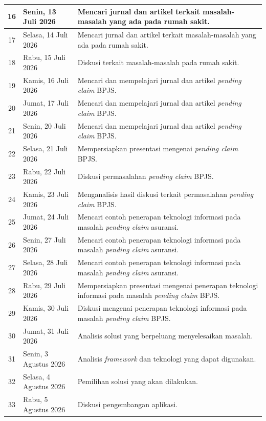 \begin{small}
\begin{longtable}{|c|>{\raggedright\arraybackslash}p{4.0cm}|>{\raggedright\arraybackslash}p{7.8cm}|}
16 & Senin, 13 Juli 2026 & Mencari jurnal dan artikel terkait masalah-masalah yang ada pada rumah sakit. \\ \hline
17 & Selasa, 14 Juli 2026 & Mencari jurnal dan artikel terkait masalah-masalah yang ada pada rumah sakit. \\ \hline
18 & Rabu, 15 Juli 2026 & Diskusi terkait masalah-masalah pada rumah sakit. \\ \hline
19 & Kamis, 16 Juli 2026 & Mencari dan mempelajari jurnal dan artikel \textit{pending claim} BPJS. \\ \hline
20 & Jumat, 17 Juli 2026 & Mencari dan mempelajari jurnal dan artikel \textit{pending claim} BPJS. \\ \hline
21 & Senin, 20 Juli 2026 & Mencari dan mempelajari jurnal dan artikel \textit{pending claim} BPJS. \\ \hline
22 & Selasa, 21 Juli 2026 & Mempersiapkan presentasi mengenai \textit{pending claim} BPJS. \\ \hline
23 & Rabu, 22 Juli 2026 & Diskusi permasalahan \textit{pending claim} BPJS. \\ \hline
24 & Kamis, 23 Juli 2026 & Menganalisis hasil diskusi terkait permasalahan \textit{pending claim} BPJS. \\ \hline
25 & Jumat, 24 Juli 2026 & Mencari contoh penerapan teknologi informasi pada masalah \textit{pending claim} asuransi. \\ \hline
26 & Senin, 27 Juli 2026 & Mencari contoh penerapan teknologi informasi pada masalah \textit{pending claim} asuransi. \\ \hline
27 & Selasa, 28 Juli 2026 & Mencari contoh penerapan teknologi informasi pada masalah \textit{pending claim} asuransi. \\ \hline
28 & Rabu, 29 Juli 2026 & Mempersiapkan presentasi mengenai penerapan teknologi informasi pada masalah \textit{pending claim} BPJS. \\ \hline
29 & Kamis, 30 Juli 2026 & Diskusi mengenai penerapan teknologi informasi pada masalah \textit{pending claim} BPJS. \\ \hline
30 & Jumat, 31 Juli 2026 & Analisis solusi yang berpeluang menyelesaikan masalah. \\ \hline
31 & Senin, 3 Agustus 2026 & Analisis \textit{framework} dan teknologi yang dapat digunakan. \\ \hline
32 & Selasa, 4 Agustus 2026 & Pemilihan solusi yang akan dilakukan. \\ \hline
33 & Rabu, 5 Agustus 2026 & Diskusi pengembangan aplikasi. \\ \hline

\end{longtable}
\end{small}
